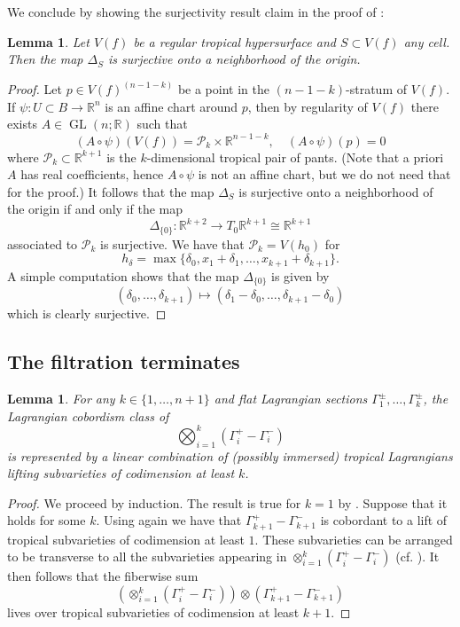 \documentclass[10pt]{amsart}
\newtheorem{lem}[thm]{Lemma}
\theoremstyle{definition}
\theoremstyle{remark}
\def\R{\mathbb{R}}
\DeclareMathOperator{\GL}{GL}
\def\x{\times}
\begin{document}
We conclude by showing the surjectivity result claim in the proof of :
\begin{lem}\label{lem:perturbations_surject}
    Let $V(f)$ be a regular tropical hypersurface and $S \subset V(f)$ any cell.
    Then the map $\Delta_S$ is surjective onto a neighborhood of the origin.
\end{lem}
\begin{proof}
    Let $p \in V(f)^{(n-1-k)}$ be a point in the $(n-1-k)$-stratum of $V(f)$.
    If $\psi: U \subset B \to \R^n$ is an affine chart around $p$, then by regularity of $V(f)$ there exists $A \in \GL(n;\R)$ such that
    $$
    (A \circ \psi)(V(f)) = \mathcal P_{k} \x \R^{n-1-k},\quad (A\circ\psi)(p)=0
    $$
    where $\mathcal P_{k} \subset \R^{k+1}$ is the $k$-dimensional tropical pair of pants.
    (Note that a priori $A$ has real coefficients, hence $A \circ \psi$ is not an affine chart, but we do not need that for the proof.)
    It follows that the map $\Delta_S$ is surjective onto a neighborhood of the origin if and only if the map 
    $$
        \Delta_{\{0\}}: \R^{k+2} \to T_0 \R^{k+1} \cong \R^{k+1}
    $$
    associated to $\mathcal P_{k}$ is surjective. 
    We have that $\mathcal P_{k} = V(h_0)$ for
    $$
        h_\delta = \max\{\delta_0,x_1+\delta_1,\dots,x_{k+1}+\delta_{k+1}\}.
    $$
    A simple computation shows that the map $\Delta_{\{0\}}$ is given by
    $$
        (\delta_0,\dots,\delta_{k+1}) \mapsto (\delta_1-\delta_0,\dots,\delta_{k+1}-\delta_0)
    $$
    which is clearly surjective.
\end{proof}

\subsection{The filtration terminates}
\begin{lem}\label{prop:fiberwise_sum_increases_codimension}
    For any $k \in \{1,\dots,n+1\}$ and flat Lagrangian sections $\Gamma_1^\pm,\dots,\Gamma_k^\pm$, the Lagrangian cobordism class of 
    $$
        \bigotimes_{i=1}^k (\Gamma_i^+ - \Gamma_i^-)
    $$
    is represented by a linear combination of (possibly immersed) tropical Lagrangians lifting subvarieties of codimension at least $k$.
\end{lem}
\begin{proof}
    We proceed by induction.
    The result is true for $k=1$ by . 
    Suppose that it holds for some $k$. 
    Using again   we have that $\Gamma_{k+1}^+ - \Gamma_{k+1}^-$ is cobordant to a lift of tropical subvarieties of codimension at least $1$.
    These subvarieties can be arranged to be transverse to all the subvarieties appearing in $\otimes_{i=1}^k (\Gamma_i^+ - \Gamma_i^-)$ (cf. ).
    It then follows that the fiberwise sum
    $$
    \left(\otimes_{i=1}^k (\Gamma_i^+ - \Gamma_i^-)\right) \otimes (\Gamma_{k+1}^+ - \Gamma_{k+1}^-)
    $$
    lives over tropical subvarieties of codimension at least $k+1$.
\end{proof}
\end{document}
